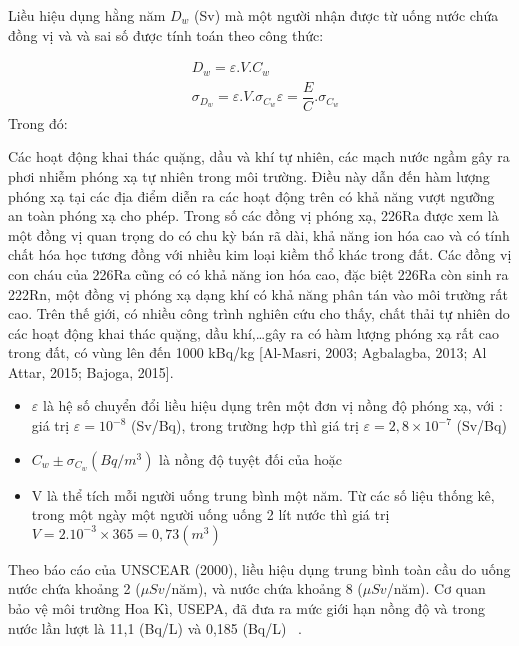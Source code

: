 
      Liều hiệu dụng hằng năm $D_w$ (Sv) mà một người nhận được từ uống nước chứa đồng vị  và  và sai số được tính toán theo công thức:  

      \begin{align}
          &D_w = \varepsilon. V. C_w\\
          &\sigma_{D_w} = \varepsilon.V.\sigma_{C_w} \varepsilon = \dfrac{E}{C}.\sigma_{C_w}
      \end{align}
      Trong đó: 

      Các hoạt động khai thác quặng, dầu và khí tự nhiên, các mạch nước ngầm gây ra phơi nhiễm phóng xạ tự nhiên trong môi trường. Điều này dẫn đến hàm lượng phóng xạ tại các địa điểm diễn ra các hoạt động trên có khả năng vượt ngưỡng an toàn phóng xạ cho phép. Trong số các đồng vị phóng xạ, 226Ra được xem là một đồng vị quan trọng do có chu kỳ bán rã dài, khả năng ion hóa cao và có tính chất hóa học tương đồng với nhiều kim loại kiềm thổ khác trong đất. Các đồng vị con cháu của 226Ra cũng có có khả năng ion hóa cao, đặc biệt 226Ra còn sinh ra 222Rn, một đồng vị phóng xạ dạng khí có khả năng phân tán vào môi trường rất cao. Trên thế giới, có nhiều công trình nghiên cứu cho thấy, chất thải tự nhiên do các hoạt động khai thác quặng, dầu khí,…gây ra có hàm lượng phóng xạ rất cao trong đất, có vùng lên đến 1000 kBq/kg [Al-Masri, 2003; Agbalagba, 2013; Al Attar, 2015; Bajoga, 2015].
      
      \begin{itemize}
          \item $\varepsilon$ là hệ số chuyển đổi liều hiệu dụng trên một đơn vị nồng độ phóng xạ, với : giá trị $\varepsilon= 10^{-8}$ (Sv/Bq), trong trường hợp  thì giá trị $\varepsilon  = 2,8 \times 10^{-7} $ (Sv/Bq)
          \item $C_w \pm \sigma_{C_w}  (Bq/m^3)  $ là nồng độ tuyệt đối của    hoặc 
          \item V là thể tích mỗi người uống trung bình một năm. Từ các số liệu thống kê, trong một ngày một người uống  uống 2 lít nước thì giá trị $V  = 2.10^{-3} \times 365 = 0,73 (m^3) $ 
      \end{itemize}

     Theo báo cáo của UNSCEAR (2000), liều hiệu dụng trung bình toàn cầu do uống nước chứa  khoảng 2 ($\mu Sv$/năm), và nước  chứa  khoảng 8  ($\mu Sv$/năm).  Cơ quan bảo vệ môi trường Hoa Kì, USEPA, đã đưa ra mức giới hạn nồng độ   và  trong nước lần lượt là 11,1 (Bq/L) và 0,185 (Bq/L) ~\cite{Thesis:HNPThu}. 
     
     